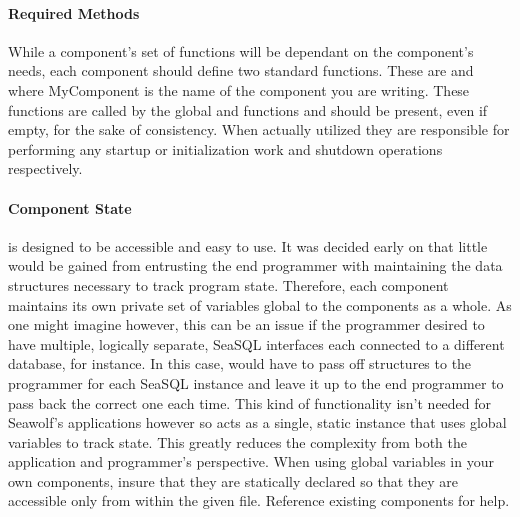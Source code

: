 \paragraph{Required Methods}
While a component's set of functions will be dependant on the component's needs,
each component should define two standard functions. These are 
\hfill\vspace{8pt}\newline
\indent{} and 
\vspace{8pt}\newline where MyComponent is the name of the component you are
writing. These functions are called by the global
 and
 functions and should be
present, even if empty, for the sake of consistency. When actually utilized they
are responsible for performing any startup or initialization work and shutdown
operations respectively.

\paragraph{Component State}
\libseawolf{} is designed to be accessible and easy to use. It was decided early
on that little would be gained from entrusting the end programmer with
maintaining the data structures necessary to track program state. Therefore,
each component maintains its own private set of variables global to the
components as a whole. As one might imagine however, this can be an issue if the
programmer desired to have multiple, logically separate, SeaSQL interfaces each
connected to a different database, for instance. In this case, \libseawolf{}
would have to pass off structures to the programmer for each SeaSQL instance and
leave it up to the end programmer to pass back the correct one each time. This
kind of functionality isn't needed for Seawolf's applications however so
\libseawolf{} acts as a single, static instance that uses global variables to
track state.  This greatly reduces the complexity from both the application and
\libseawolf{} programmer's perspective. When using global variables in your own
components, insure that they are statically declared so that they are accessible
only from within the given file. Reference existing components for help.

